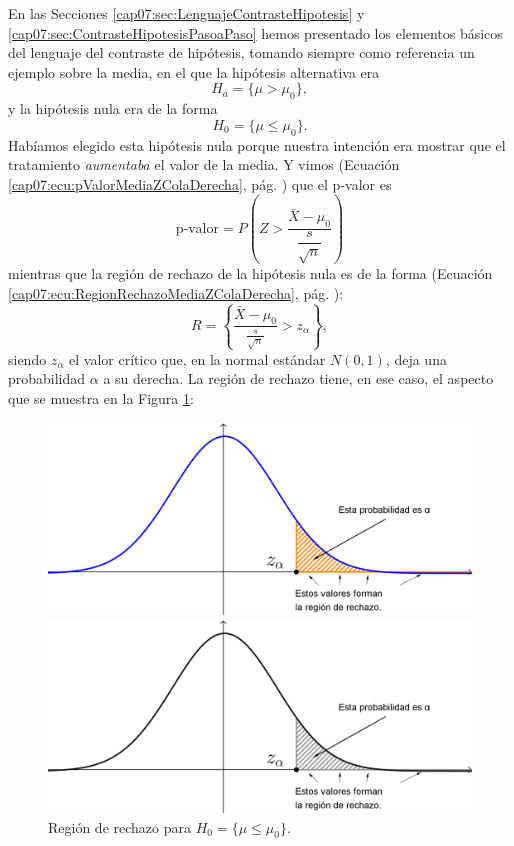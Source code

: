 En las Secciones \ref{cap07:sec:LenguajeContrasteHipotesis} y \ref{cap07:sec:ContrasteHipotesisPasoaPaso} hemos presentado los elementos básicos del lenguaje del contraste de hipótesis, tomando siempre como referencia un ejemplo sobre la media, en el que la hipótesis alternativa era
    \[H_a=\{\mu>\mu_0\},\]
y la hipótesis nula era de la forma
    \[H_0=\{\mu\leq \mu_0\}.\]
Habíamos elegido esta hipótesis nula porque nuestra intención era mostrar que el tratamiento {\em aumentaba} el valor de la media. Y vimos (Ecuación \ref{cap07:ecu:pValorMediaZColaDerecha}, pág. \pageref{cap07:ecu:pValorMediaZColaDerecha}) que el p-valor es
\[
\mbox{p-valor}=P\left(Z > \dfrac{\bar X-\mu_0}{\dfrac{s}{\sqrt{n}}}\right)
\]
mientras que la región de rechazo de la hipótesis nula es de la forma (Ecuación \ref{cap07:ecu:RegionRechazoMediaZColaDerecha}, pág. \pageref{cap07:ecu:RegionRechazoMediaZColaDerecha}):
    \[R=\left\{\dfrac{\bar X-\mu_0}{\frac{s}{\sqrt{n}}}>z_{\alpha}\right\},\]
siendo $z_{\alpha}$ el valor crítico que, en la normal estándar  $N(0,1)$, deja una probabilidad $\alpha$ a su derecha. La región de rechazo tiene, en ese caso, el aspecto que se muestra en la Figura \ref{cap07:fig:RegionRechazoNormalColaDerecha}:

\begin{figure}[htbp]
\begin{center}
\begin{enColor}
\includegraphics[width=13cm]{../fig/Cap07-RegionRechazoNormalColaDerecha.png}
\end{enColor}
\begin{bn}
\includegraphics[width=13cm]{../fig/Cap07-RegionRechazoNormalColaDerecha-bn.png}
\end{bn}
\caption{Regi\'on de rechazo para $H_0=\{\mu\leq \mu_0\}$.}
\label{cap07:fig:RegionRechazoNormalColaDerecha}
\end{center}
\end{figure}

